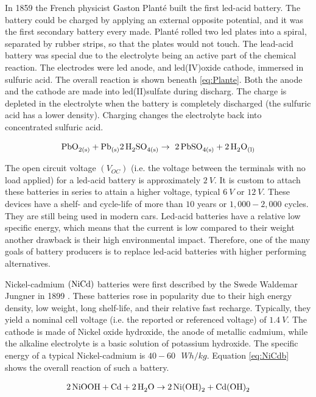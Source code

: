 In 1859 the French physicist Gaston Planté built the first led-acid battery. The battery could be charged by applying an external opposite potential, and it was the first secondary battery every made. Planté rolled two led plates into a spiral, separated by rubber strips, so that the plates would not touch. The lead-acid battery was special due to the electrolyte being an active part of the chemical reaction. The electrodes were led anode, and led(IV)oxide cathode, immersed in sulfuric acid. The overall reaction is shown beneath \ref{eq:Plante}. Both the anode and the cathode are made into led(II)sulfate during discharg. The charge is depleted in the electrolyte when the battery is completely discharged (the sulfuric acid has a lower density). Charging changes the electrolyte back into concentrated sulfuric acid.

\begin{align}\label{eq:Plante}
\ce{PbO_{2(s)}} + \ce{Pb_{(s)}} \ce{2H_2SO_{4(s)}} \rightarrow \ce{2PbSO_{4(s)}} +\ce{2H_2O_{(l)}}
\end{align}

The open circuit voltage $(V_{OC})$ (i.e. the voltage between the terminals with no load applied) for a led-acid battery is approximately $\SI{2}{V}$. It is custom to attach these batteries in series to attain a higher voltage, typical $\SI{6}{V}$ or $\SI{12}{V}$. These devices have a shelf- and cycle-life of more than $10$ years or $1,000-2,000$ cycles. They are still being used in modern cars. Led-acid batteries have a relative low specific energy, which means that the current is low compared to their weight another drawback is their high environmental impact. Therefore, one of the many goals of battery producers is to replace led-acid batteries with higher performing alternatives.

Nickel-cadmium $(\ce{NiCd})$ batteries were first described by the Swede Waldemar Jungner in 1899 \cite{daniel2012handbook}. These batteries rose in popularity due to their high energy density, low weight, long shelf-life, and their relative fast recharge. Typically, they yield a nominal cell voltage (i.e. the reported or referenced voltage) of $\SI{1.4}{V}$. The cathode is made of Nickel oxide hydroxide, the anode of metallic cadmium, while the alkaline electrolyte is a basic solution of potassium hydroxide. The specific energy of a typical Nickel-cadmium is $40-60\text{ }\si{W h/kg}$. Equation \ref{eq:NiCdb} shows the overall reaction of such a battery.

\begin{align}\label{eq:NiCdb}
\ce{2NiOOH} + \ce{Cd} + \ce{2H_2O} \rightarrow \ce{2Ni(OH)_2} + \ce{Cd(OH)_2}
\end{align}

